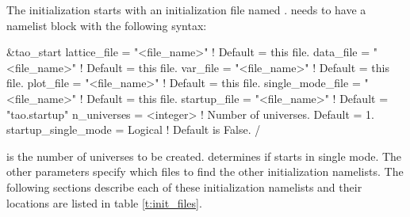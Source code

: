 The initialization starts with an initialization file named . 
 needs to have a  namelist block with the following syntax:
\begin{example}
  \&tao_start
    lattice_file      = "<file_name>"  ! Default = this file.
    data_file         = "<file_name>"  ! Default = this file.
    var_file          = "<file_name>"  ! Default = this file.
    plot_file         = "<file_name>"  ! Default = this file.
    single_mode_file  = "<file_name>"  ! Default = this file.
    startup_file      = "<file_name>"  ! Default = "tao.startup"
    n_universes       = <integer>            ! Number of universes. Default = 1.
    startup_single_mode = Logical            ! Default is False.
  /
\end{example}
 is the number of universes to be created.
 determines if  starts in single mode. The other
parameters specify which files to find the other initialization namelists. The
following sections describe each of these initialization namelists and their
locations are listed in table \ref{t:init_files}.

